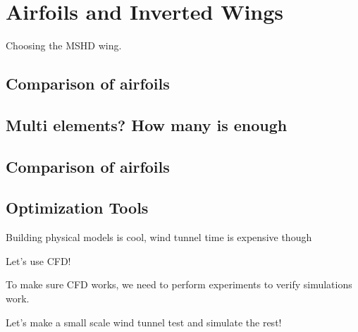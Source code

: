 \chapter{Airfoils and Inverted Wings}

Choosing the MSHD wing.

\section{Comparison of airfoils}

\section{Multi elements? How many is enough}

\section{Comparison of airfoils}

\section{Optimization Tools}

Building physical models is cool, wind tunnel time is expensive though

Let's use CFD!

To make sure CFD works, we need to perform experiments to verify simulations work.

Let's make a small scale wind tunnel test and simulate the rest!

